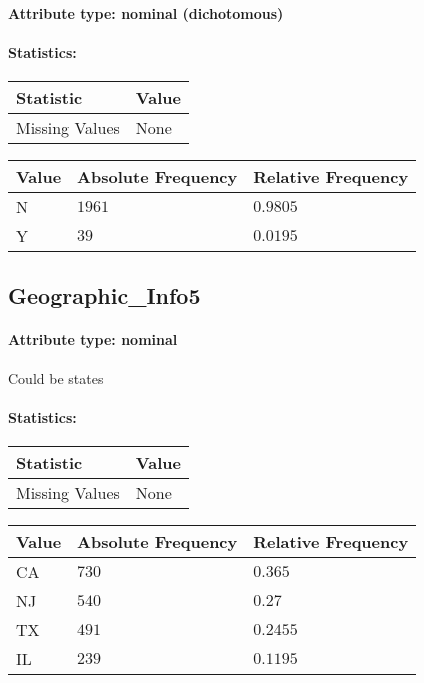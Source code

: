 \paragraph{Attribute type: nominal (dichotomous)}
\paragraph{Statistics: }
\begin{table}[H]
	\renewcommand{\arraystretch}{1.25}
	\begin{tabular}{l|l}
		\textbf{Statistic} & \textbf{Value}\\\hline
		Missing Values& None\\\hline
	\end{tabular}
\end{table}
\begin{table}[H]
	\renewcommand{\arraystretch}{1.25}
	\begin{tabular}{l|l|l}
		\textbf{Value} & \textbf{Absolute Frequency} & \textbf{Relative Frequency}\\\hline
		N&$1961$&$0.9805$\\\hline
		Y&$39$&$0.0195$
	\end{tabular}
\end{table}

\subsection{Geographic\_Info5}
\paragraph{Attribute type: nominal} Could be states
\paragraph{Statistics: }
\begin{table}[H]
	\renewcommand{\arraystretch}{1.25}
	\begin{tabular}{l|l}
		\textbf{Statistic} & \textbf{Value}\\\hline
		Missing Values& None\\\hline
	\end{tabular}
\end{table}
\begin{table}[H]
	\renewcommand{\arraystretch}{1.25}
	\begin{tabular}{l|l|l}
		\textbf{Value} & \textbf{Absolute Frequency} & \textbf{Relative Frequency}\\\hline
		CA&$730$&$0.365$\\\hline
		NJ&$540$&$0.27$\\\hline
		TX&$491$&$0.2455$\\\hline
		IL&$239$&$0.1195$
	\end{tabular}
\end{table}

